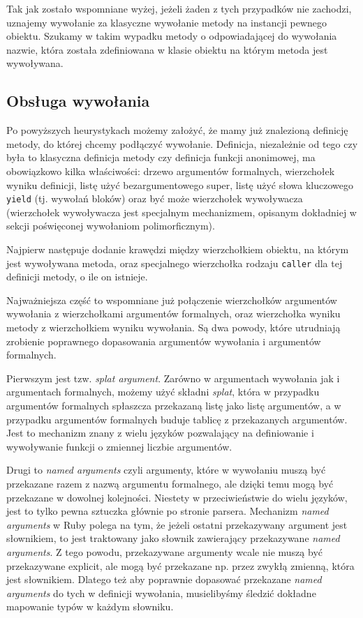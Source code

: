 \documentclass[declaration,shortabstract]{iithesis}
\begin{document}
Tak jak zostało wspomniane wyżej, jeżeli żaden z tych przypadków nie zachodzi, uznajemy wywołanie za klasyczne wywołanie metody na instancji pewnego obiektu. Szukamy w takim wypadku metody o odpowiadającej do wywołania nazwie, która została zdefiniowana w klasie obiektu na którym metoda jest wywoływana.

\subsection{Obsługa wywołania}

Po powyższych heurystykach możemy założyć, że mamy już znalezioną definicję metody, do której chcemy podłączyć wywołanie. Definicja, niezależnie od tego czy była to klasyczna definicja metody czy definicja funkcji anonimowej, ma obowiązkowo kilka właściwości: drzewo argumentów formalnych, wierzchołek wyniku definicji, listę użyć bezargumentowego super, listę użyć słowa kluczowego \texttt{yield} (tj. wywołań bloków) oraz być może wierzchołek wywoływacza (wierzchołek wywoływacza jest specjalnym mechanizmem, opisanym dokładniej w sekcji poświęconej wywołaniom polimorficznym).

Najpierw następuje dodanie krawędzi między wierzchołkiem obiektu, na którym jest wywoływana metoda, oraz specjalnego wierzchołka rodzaju \texttt{caller} dla tej definicji metody, o ile on istnieje.

Najważniejsza część to wspomniane już połączenie wierzchołków argumentów wywołania z wierzchołkami argumentów formalnych, oraz wierzchołka wyniku metody z wierzchołkiem wyniku wywołania. Są dwa powody, które utrudniają zrobienie poprawnego dopasowania argumentów wywołania i argumentów formalnych.

Pierwszym jest tzw. \textit{splat argument}. Zarówno w argumentach wywołania jak i argumentach formalnych, możemy użyć składni \textit{splat}, która w przypadku argumentów formalnych spłaszcza przekazaną listę jako listę argumentów, a w przypadku argumentów formalnych buduje tablicę z przekazanych argumentów. Jest to mechanizm znany z wielu języków pozwalający na definiowanie i wywoływanie funkcji o zmiennej liczbie argumentów. 

Drugi to \textit{named arguments} czyli argumenty, które w wywołaniu muszą być przekazane razem z nazwą argumentu formalnego, ale dzięki temu mogą być przekazane w dowolnej kolejności. Niestety w przeciwieństwie do wielu języków, jest to tylko pewna sztuczka głównie po stronie parsera. Mechanizm \textit{named arguments} w Ruby polega na tym, że jeżeli ostatni przekazywany argument jest słownikiem, to jest traktowany jako słownik zawierający przekazywane \textit{named arguments}. Z tego powodu, przekazywane argumenty wcale nie muszą być przekazywane explicit, ale mogą być przekazane np. przez zwykłą zmienną, która jest słownikiem. Dlatego też aby poprawnie dopasować przekazane \textit{named arguments} do tych w definicji wywołania, musielibyśmy śledzić dokładne mapowanie typów w każdym słowniku.
\end{document}
